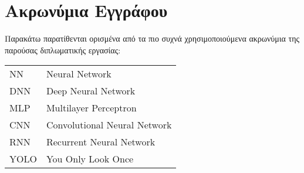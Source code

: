 \chapter*{Ακρωνύμια Εγγράφου}
\label{append:acronyms}
{}

Παρακάτω παρατίθενται ορισμένα από τα πιο συχνά χρησιμοποιούμενα ακρωνύμια της
παρούσας διπλωματικής εργασίας:

\begin{table}[htpb]
  \centering
  \begin{tabular}{l@{$\;\;\longrightarrow\;\;$}l}
    NN & Neural Network \\
    DNN & Deep Neural Network \\
    MLP & Multilayer Perceptron \\
    CNN & Convolutional Neural Network \\
    RNN & Recurrent Neural Network \\
    YOLO & You Only Look Once
  \end{tabular}
\end{table}
